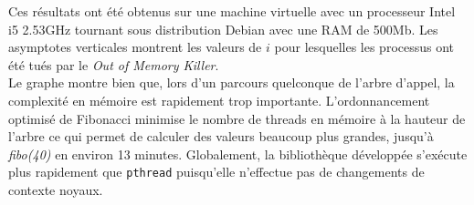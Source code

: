 Ces résultats ont été obtenus sur une machine virtuelle avec un processeur Intel i5 2.53GHz tournant sous distribution Debian avec une RAM de 500Mb. Les asymptotes verticales montrent les valeurs de $i$ pour lesquelles les processus ont été tués par le \textit{Out of Memory Killer}.
\\

Le graphe montre bien que, lors d'un parcours quelconque de l'arbre d'appel, la complexité en mémoire est rapidement trop importante. L'ordonnancement optimisé de Fibonacci minimise le nombre de threads en mémoire à la hauteur de l'arbre ce qui permet de calculer des valeurs beaucoup plus grandes, jusqu'à \textit{fibo(40)} en environ 13 minutes. Globalement, la bibliothèque développée s'exécute plus rapidement que \texttt{pthread} puisqu'elle n'effectue pas de changements de contexte noyaux.
\\